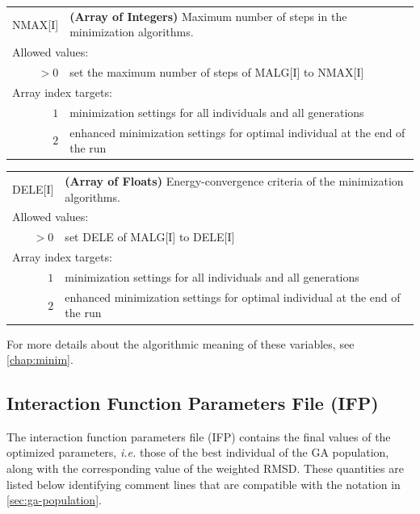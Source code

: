 \documentclass[10pt,a4paper,openany]{memoir}
\numberwithin{equation}{section}
\begin{document}
{
\begin{tabular}{r@{ : }l}
\label{descr:nmax}
      NMAX[I]&\textbf{(Array of Integers)} Maximum number of steps in the minimization algorithms.                                              \\ 
\multicolumn{2}{l}{Allowed values:} \\ 
    \(>0\)&set the maximum number of steps of MALG[I] to NMAX[I]                                                \\ 
\multicolumn{2}{l}{Array index targets:} \\ 
  \(1\)&minimization settings for all individuals and all generations \\
  \(2\)&enhanced minimization settings for optimal individual at the end of the run \\
\end{tabular}
\vspace{1ex}
}

{
\begin{tabular}{r@{ : }l}
\label{descr:dele}
      DELE[I]&\textbf{(Array of Floats)} Energy-convergence criteria of the minimization algorithms.                                          \\ 
\multicolumn{2}{l}{Allowed values:} \\ 
    \(>0\)&set DELE of MALG[I] to DELE[I] \\ 
\multicolumn{2}{l}{Array index targets:} \\ 
  \(1\)&minimization settings for all individuals and all generations \\
  \(2\)&enhanced minimization settings for optimal individual at the end of the run \\
\end{tabular}
\vspace{1ex}
}

\noindent For more details about the algorithmic meaning of these variables, see \autoref{chap:minim}.

\subsection{Interaction Function Parameters File (IFP)}
\label{sec:file-formats-IFP}

The interaction function parameters file (IFP) contains the final
values of the optimized parameters, \textit{i.e.} those of the best
individual of the GA population, along with the corresponding value of
the weighted RMSD. These quantities are listed below identifying
comment lines that are compatible with the notation in
\autoref{sec:ga-population}.
\end{document}
